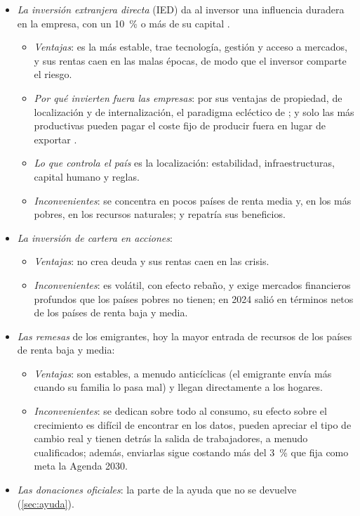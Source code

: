 \documentclass[11pt]{article}
\begin{document}
\begin{itemize}
\item \emph{La inversión extranjera directa} (IED) da al inversor una influencia duradera en la empresa, con un 10~\% o más de su capital\nocite{FMI2009MBP6} .
  \begin{itemize}
  \item \emph{Ventajas}: es la más estable, trae tecnología, gestión y acceso a mercados, y sus rentas caen en las malas épocas, de modo que el inversor comparte el riesgo.
  \item \emph{Por qué invierten fuera las empresas}: por sus ventajas de propiedad, de localización y de internalización, el paradigma ecléctico de \textcite{Dunning1980}; y solo las más productivas pueden pagar el coste fijo de producir fuera en lugar de exportar\nocite{HelpmanMelitzYeaple2004} .
  \item \emph{Lo que controla el país} es la localización: estabilidad, infraestructuras, capital humano y reglas.
  \item \emph{Inconvenientes}: se concentra en pocos países de renta media y, en los más pobres, en los recursos naturales; y repatría sus beneficios.
  \end{itemize}
\item \emph{La inversión de cartera en acciones}:
  \begin{itemize}
  \item \emph{Ventajas}: no crea deuda y sus rentas caen en las crisis.
  \item \emph{Inconvenientes}: es volátil, con efecto rebaño, y exige mercados financieros profundos que los países pobres no tienen; en 2024 salió en términos netos de los países de renta baja y media\nocite{BancoMundial2026WDIFlujos}.
  \end{itemize}
\item \emph{Las remesas} de los emigrantes, hoy la mayor entrada de recursos de los países de renta baja y media:
  \begin{itemize}
  \item \emph{Ventajas}: son estables, a menudo anticíclicas (el emigrante envía más cuando su familia lo pasa mal) y llegan directamente a los hogares.
  \item \emph{Inconvenientes}: se dedican sobre todo al consumo, su efecto sobre el crecimiento es difícil de encontrar en los datos\nocite{ClemensMcKenzie2018}, pueden apreciar el tipo de cambio real y tienen detrás la salida de trabajadores, a menudo cualificados; además, enviarlas sigue costando más del 3~\% que fija como meta la Agenda 2030.
  \end{itemize}
\item \emph{Las donaciones oficiales}: la parte de la ayuda que no se devuelve (\ref{sec:ayuda}).
\end{itemize}
\end{document}
